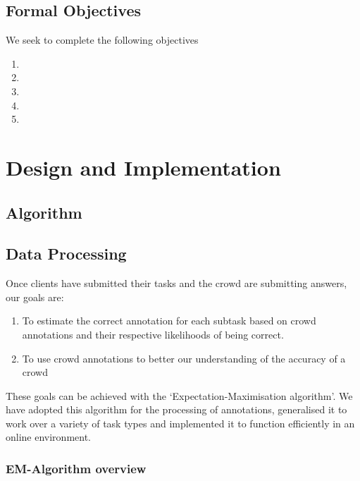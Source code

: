 \documentclass[11pt]{article}
\begin{document}
\subsection{Formal Objectives}
We seek to complete the following objectives
\begin{enumerate}
\item

\item

\item

\item

\item
\end{enumerate}



\section{Design and Implementation}
\subsection{Algorithm}
\subsection{Data Processing}

Once clients have submitted their tasks and the crowd are submitting answers, our goals are:
\begin{enumerate}
\item To estimate the correct annotation for each subtask based on crowd annotations and their respective likelihoods of being correct.
\item To use crowd annotations to better our understanding of the accuracy of a crowd
\end{enumerate}

These goals can be achieved with the `Expectation-Maximisation algorithm'. We have adopted this algorithm for the processing of annotations, generalised it to work over a variety of task types and implemented it to function efficiently in an online environment.\\

\subsubsection{EM-Algorithm overview}
\end{document}
